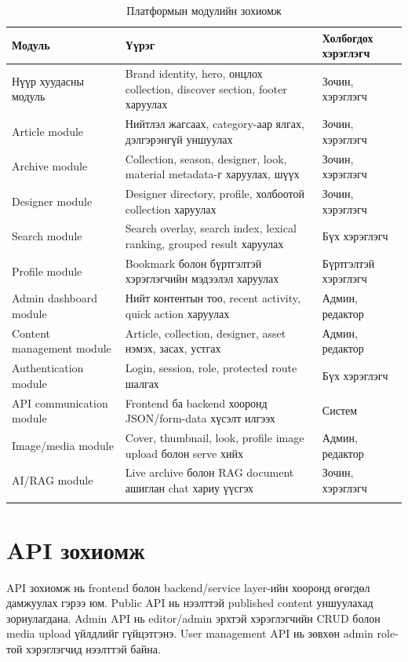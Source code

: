 \begin{longtable}{|L{0.22\textwidth}|L{0.42\textwidth}|L{0.22\textwidth}|}
  \hline
  \textbf{Модуль} & \textbf{Үүрэг} & \textbf{Холбогдох хэрэглэгч} \\ \hline
  Нүүр хуудасны модуль & Brand identity, hero, онцлох collection, discover section, footer харуулах & Зочин, хэрэглэгч \\ \hline
  Article module & Нийтлэл жагсаах, category-аар ялгах, дэлгэрэнгүй уншуулах & Зочин, хэрэглэгч \\ \hline
  Archive module & Collection, season, designer, look, material metadata-г харуулах, шүүх & Зочин, хэрэглэгч \\ \hline
  Designer module & Designer directory, profile, холбоотой collection харуулах & Зочин, хэрэглэгч \\ \hline
  Search module & Search overlay, search index, lexical ranking, grouped result харуулах & Бүх хэрэглэгч \\ \hline
  Profile module & Bookmark болон бүртгэлтэй хэрэглэгчийн мэдээлэл харуулах & Бүртгэлтэй хэрэглэгч \\ \hline
  Admin dashboard module & Нийт контентын тоо, recent activity, quick action харуулах & Админ, редактор \\ \hline
  Content management module & Article, collection, designer, asset нэмэх, засах, устгах & Админ, редактор \\ \hline
  Authentication module & Login, session, role, protected route шалгах & Бүх хэрэглэгч \\ \hline
  API communication module & Frontend ба backend хооронд JSON/form-data хүсэлт илгээх & Систем \\ \hline
  Image/media module & Cover, thumbnail, look, profile image upload болон serve хийх & Админ, редактор \\ \hline
  AI/RAG module & Live archive болон RAG document ашиглан chat хариу үүсгэх & Зочин, хэрэглэгч \\ \hline
  \caption{Платформын модулийн зохиомж}
  \label{tab:ch3-module-design}\\
\end{longtable}

\section{API зохиомж}
API зохиомж нь frontend болон backend/service layer-ийн хооронд өгөгдөл дамжуулах гэрээ юм. Public API нь нээлттэй published content уншуулахад зориулагдана. Admin API нь editor/admin эрхтэй хэрэглэгчийн CRUD болон media upload үйлдлийг гүйцэтгэнэ. User management API нь зөвхөн admin role-той хэрэглэгчид нээлттэй байна.

